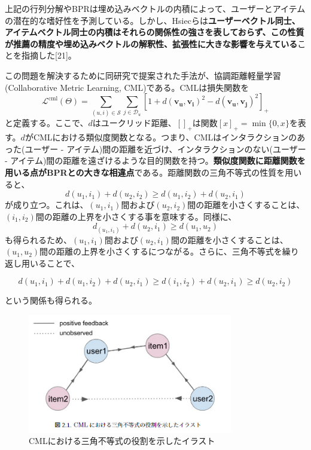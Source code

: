 \documentclass[11pt,a4paper]{article}
\begin{document}
上記の行列分解やBPRは埋め込みベクトルの内積によって、ユーザーとアイテムの潜在的な嗜好性を予測している。しかし、Hsiecらは\textbf{ユーザーベクトル同士、アイテムベクトル同士の内積はそれらの関係性の強さを表しておらず、この性質が推薦の精度や埋め込みベクトルの解釈性、拡張性に大きな影響を与えている}ことを指摘した[21]。

この問題を解決するために同研究で提案された手法が、協調距離軽量学習(Collaborative Metric Learning, CML)である。CMLは損失関数を
$$
  \mathcal{L}^{\text{cml}}(\Theta) = \sum_{(u,i) \in \mathcal{S}} \sum_{j \in \mathcal{D}_u} [1 + d(\mathbf{v_u}, \mathbf{v_i})^2 - d(\mathbf{v_u}, \mathbf{v_j})^2]_+
$$
と定義する。ここで、$d$はユークリッド距離、$[]_+$は関数$[x]_+ = \min\{ 0, x \}$を表す。$d$がCMLにおける類似度関数となる。つまり、CMLはインタラクションのあった(ユーザー - アイテム)間の距離を近づけ、インタラクションのない(ユーザー - アイテム)間の距離を遠ざけるような目的関数を持つ。\textbf{類似度関数に距離関数を用いる点がBPRとの大きな相違点}である。距離関数の三角不等式の性質を用いると、
$$
  d(u_1, i_1) + d(u_2, i_2) \geq d(u_1, i_2) + d(u_2, i_1)
$$
が成り立つ。これは、$(u_1, i_1)$間および$(u_2, i_2)$間の距離を小さくすることは、$(i_1, i_2)$間の距離の上界を小さくする事を意味する。同様に、
$$
  d_(u_1, i_1) + d(u_2, i_1) \geq d(u_1, u_2)
$$
も得られるため、$(u_1, i_1)$間および$(u_2, i_1)$間の距離を小さくすることは、$(u_1, u_2)$間の距離の上界を小さくするにつながる。さらに、三角不等式を繰り返し用いることで、

$$
  d(u_1, i_1) + d(u_1, i_2) + d(u_2, i_1) \geq d(i_1, i_2) + d(u_2, i_1) \geq d(u_2, i_2)
$$

という関係も得られる。

\begin{figure}[h]
  \centering
  \includegraphics[width=0.8\textwidth]{CMLにおける三角不等式の役割を示したイラスト.png}
  \caption{CMLにおける三角不等式の役割を示したイラスト}
\end{figure}
\end{document}
